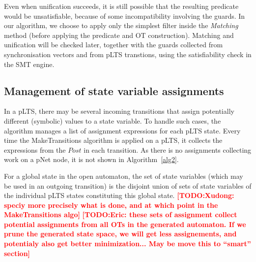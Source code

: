 \documentclass[smallcondensed]{svjour3}
\newcommand{\TODO}[1]{\textcolor{red}{\textbf{[TODO:#1]}}}
\newcommand{\QIN}[1]{\textcolor{airforceblue}{#1}}
\begin{document}
Even when unification succeeds, it is still possible that
the resulting predicate would be unsatisfiable, because of some
incompatibility involving the guards. In our algorithm, we choose to
apply only the simplest filter inside the \emph{Matching} method
(before applying the predicate and OT construction). Matching and
unification  will be checked later, together with the guards collected
from synchronisation vectors and from pLTS transtions, using the
satisfiability check in the SMT engine.


\subsection{Management of state variable assignments}


In a pLTS, there may be several incoming transitions 
that assign potentially different (symbolic) values to a state variable.
To handle such cases, the algorithm manages a
list of assignment expressions for each pLTS state. 
\QIN{Every time the MakeTransitions
algorithm is applied on a pLTS, it collects the expressions from the $Post$ in each transition.
As there is no assignments collecting work on a pNet node, it is not shown in Algorithm~\ref{alg2}.}

For a global state in the open automaton, the set of state
variables (which may be used in an outgoing transition) %
is the disjoint union
of sets of state variables of the individual pLTS states constituting this
global state.
\TODO{Xudong: speciy more precisely what is done, and at which point
  in the MakeTransitions algo}
\TODO{Eric: these sets of assignment collect potential assignments from all OTs
  in the generated automaton. If we prune the generated state
  space, we will get less assignements, and potentialy also get better
  minimization... May be move this to ``smart'' section}
\end{document}
